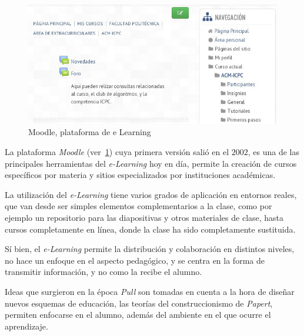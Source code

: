\begin{figure}[h] 
\centering 
\includegraphics[scale=0.5]{tics/images/moodle.jpg}
\caption{Moodle, plataforma de e Learning} 
\label{fig:moodle}
\end{figure}


La plataforma \emph{Moodle} (ver~\ref{fig:moodle}) cuya primera versión salió en
el $2002$, es una de las principales herramientas del \emph{e-Learning} hoy en
día, permite la creación de cursos específicos por materia y sitios
especializados por instituciones académicas\cite{perkins2006using}. 

La utilización del \emph{e-Learning} tiene varios grados de aplicación en
entornos reales\cite{punie:ict}, que van desde ser simples elementos
complementarios a la clase, como por ejemplo un repositorio para las
diapositivas y otros materiales de clase, hasta cursos completamente en línea,
donde la clase ha sido completamente sustituida.

Sí bien, el \emph{e-Learning} permite la distribución y colaboración en
distintos niveles, no hace un enfoque en el aspecto pedagógico, y se centra en
la forma de transmitir información, y no como la recibe el
alumno\cite{leinonen:ict}.

Ideas que surgieron en la época \emph{Pull} son tomadas en cuenta a la hora de
diseñar nuevos esquemas de educación\cite{mcdougall2006theory}, las teorías del
construccionismo de \textit{Papert}, permiten enfocarse en el alumno, además del
ambiente en el que ocurre el aprendizaje\cite{egenfeldt2007third}.

